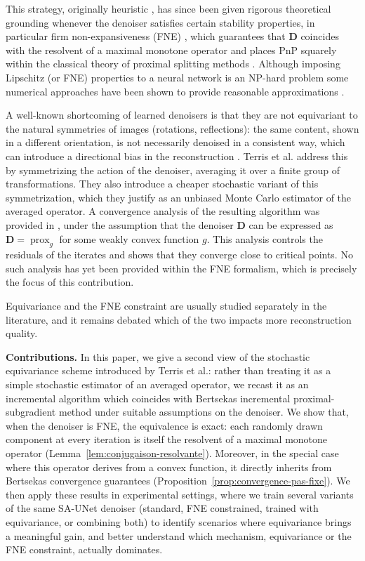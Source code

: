\documentclass{article}
\newcommand{\prox}{\operatorname{prox}}
\begin{document}
This strategy,
originally heuristic \cite{venkatakrishnan2013plugandplay,zhang2022plugandplay,kamilov2023plug}, has since been given rigorous theoretical
grounding whenever the denoiser satisfies certain stability
properties, in particular firm non-expansiveness (FNE) \cite{Pesquet2021,SantosGarcia2024}, which
guarantees that $\mathbf{D}$ coincides with the resolvent of a maximal
monotone operator \cite{Minty1962} and places PnP squarely within the
classical theory of proximal splitting methods
\cite{CombettesPesquet2011,BauschkeCombettes2017}. Although imposing Lipschitz (or FNE) properties to a neural network is an NP-hard problem \cite{szegedy2013intriguing, Scaman2018Lipschitz} some numerical approaches have been shown to provide reasonable approximations \cite{Neacsu2024a,Neacsu2024b}.

A well-known shortcoming of learned denoisers is that they are not
equivariant to the natural symmetries of images (rotations,
reflections): the same content, shown in a different orientation, is
not necessarily denoised in a consistent way, which can introduce a
directional bias in the reconstruction \cite{chen2023imaging,tachella2026self}. Terris et al.
\cite{Terris2024} address this by symmetrizing the action of the denoiser,
averaging it over a finite group of transformations. They also
introduce a cheaper stochastic variant of this symmetrization, which
they justify as an unbiased Monte Carlo estimator of the averaged
operator. A convergence analysis of the resulting algorithm was provided in \cite{renaud2026equivariant}, under the assumption that the denoiser $\mathbf{D}$ can be expressed as  $\mathbf{D}= \prox_{g}$ for some weakly convex function  $g$. 
This analysis controls the residuals of the iterates and shows that they converge close to critical points. No such analysis has yet been provided within the FNE formalism, which is precisely the focus of this contribution.

Equivariance and the FNE constraint are
usually studied separately in the literature, and it remains debated
which of the two impacts more reconstruction quality.

\noindent \textbf{Contributions.} In this paper, we give a second view of the
stochastic equivariance scheme introduced by Terris et al.: rather
than treating it as a simple stochastic estimator of an averaged
operator, we recast it as an incremental algorithm which coincides with Bertsekas incremental
proximal-subgradient method \cite{Bertsekas2011} under suitable assumptions on the denoiser. We show that, when
the denoiser is FNE, the equivalence is exact: each
randomly drawn component at every iteration is itself the resolvent
of a maximal monotone operator (Lemma~\ref{lem:conjugaison-resolvante}). Moreover, in the special case where this operator derives from a convex
function, it directly inherits from Bertsekas convergence guarantees
(Proposition~\ref{prop:convergence-pas-fixe}). 
We then apply these results in experimental settings, where we train several variants of
the same SA-UNet denoiser \cite{Guo2020SAUNet} (standard, FNE
constrained, trained with equivariance, or combining both) to identify scenarios where equivariance brings a meaningful gain, and
better understand which mechanism, equivariance or the FNE constraint, actually
dominates.
\end{document}
